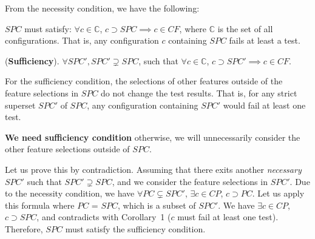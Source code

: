 From the necessity condition, we have the following:

\begin{Corollary}
$SPC$ must satisfy: $\forall c \in \mathbb{C}$, $c \supset SPC \implies c \in CF$, where $\mathbb{C}$ is the set of all configurations. That is, any configuration $c$ containing $SPC$ fails at least a test.
\end{Corollary}


\begin{Definition}{({\bf Sufficiency}).}
$\forall SPC', SPC' \supsetneq SPC$, such that $\forall c \in \mathbb{C}$, $c \supset SPC' \implies c \in CF$.
\end{Definition}


For the sufficiency condition, the selections of other features
outside of the feature selections in $SPC$ do not change the test
results. That is, for any strict superset $SPC'$ of $SPC$, any
configuration containing $SPC'$ would fail at least one test.

{\bf We need sufficiency condition} otherwise, we will
unnecessarily consider the other feature selections outside of $SPC$.
%

 Let us prove this by contradiction. Assuming
that there exits another {\em necessary} $SPC'$ such that $SPC'
\supsetneq SPC$, and we consider the feature selections in $SPC'$.
%
Due to the necessity condition, we have $\forall PC \subsetneq SPC'$,
$\exists c \in CP$, $c \supset PC$.
%
Let us apply this formula where $PC$ = $SPC$, which is a subset of $SPC'$.
We have $\exists c \in CP$, $c \supset SPC$, and contradicts
with Corollary~1 ($c$ must fail at least one test).
%
Therefore, $SPC$ must satisfy the sufficiency condition.




